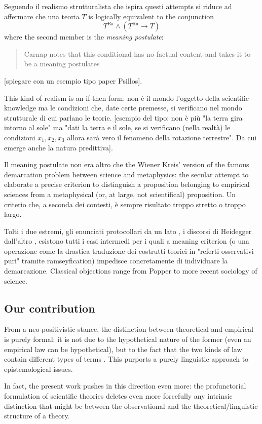 Seguendo \cite{psillos} il realismo strutturalista che ispira questi attempts si riduce ad affermare che una teoria $T$ is logically equivalent to the conjunction
\[ T^\text{Ra} \land (T^\text{Ra} \rightarrow T)
\] where the second member is the \emph{meaning postulate}:
\begin{quotation}
	Carnap notes that this conditional has no factual content and takes it to be a meaning postulates \cite{psillos}
\end{quotation}
[spiegare con un esempio tipo paper Psillos].

This kind of realism is an if-then form: non è il mondo l'oggetto della scientific knowledge ma le condizioni che, date certe premesse, si verificano nel mondo strutturale di cui parlano le teorie. [esempio del tipo: non è più "la terra gira intorno al sole" ma "dati la terra e il sole, se si verificano (nella realtà) le condizioni $x_1,x_2,x_3$ allora sarà vero il fenomeno della rotazione terrestre". Da cui emerge anche la natura predittiva]. 

Il meaning postulate non era altro che the Wiener Kreis' version of the famous demarcation problem between science and metaphysics: the secular attempt to elaborate a precise criterion to distinguish a proposition belonging to empirical sciences from a metaphysical (or, at large, not scientifical) proposition. Un criterio che, a seconda dei contesti, è sempre risultato troppo stretto o troppo largo. 

Tolti i due estremi, gli enunciati protocollari da un lato \cite{?}, i discorsi di Heidegger dall'altro \cite{?}, esistono tutti i casi intermedi per i quali a meaning criterion (o una operazione come la drastica traduzione dei costrutti teorici in "referti osservativi puri" tramite ramseyfication) impedisce concretamente di individuare la demarcazione. Classical objections range from Popper \cite{?} to more recent sociology of science.

\subsection{Our contribution}
From a neo-positivistic stance, the distinction between theoretical and empirical is purely formal: it is not due to the hypothetical nature of the former (even an empirical law can be hypothetical), but to the fact that the two kinds of law contain different types of terms \cite{carnap56}. This purports a purely linguistic approach to epistemological issues. 

In fact, the present work pushes in this direction even more: the profunctorial formulation of scientific theories deletes even more forcefully any intrinsic distinction that might be between the observational and the theoretical\fshyp{}linguistic structure of a theory.


